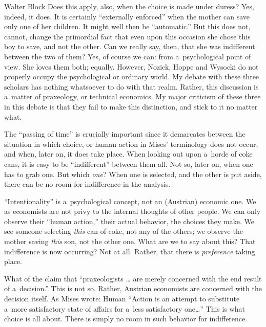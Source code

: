 \begin{artengenv}{Walter Block}
Does this apply, also, when the choice is made under duress? Yes, indeed, it does. It is certainly ``externally enforced'' when the mother can save only one of her children. It might well then be ``automatic.'' But this does not, cannot, change the primordial fact that even upon this occasion she chose this boy to save, and not the other. Can we really say, then, that she was indifferent between the two of them? Yes, of course we can: from a~psychological point of view. She loves them both; equally. However, Nozick, Hoppe and Wysocki do not properly occupy the psychological or ordinary world. My debate with these three scholars has nothing whatsoever to do with that realm. Rather, this discussion is a~matter of praxeology, or technical economics. My major criticism of these three in this debate is that they fail to make this distinction, and stick to it no matter what.

The ``passing of time'' is crucially important since it demarcates between the situation in which choice, or human action in Mises' terminology does not occur, and when, later on, it does take place. When looking out upon a~horde of coke cans, it is easy to be ``indifferent'' between them all. Not so, later on, when one has to grab one. But which \textit{one}? When one is selected, and the other is put aside, there can be no room for indifference in the analysis.

``Intentionality'' is a~psychological concept, not an (Austrian) economic one. We as economists are not privy to the internal thoughts of other people. We can only observe their ``human action,'' their actual behavior, the choices they make. We see someone selecting \textit{this} can of coke, not any of the others; we observe the mother saving \textit{this} son, not the other one. What are we to say about this? That indifference is now occurring? Not at all. Rather, that there is \textit{preference} taking place.

What of the claim that ``praxeologists … are merely concerned with the end result of a~decision.'' This is not so. Rather, Austrian economists are concerned with the decision itself. As Mises
\parencite*[][p.97]{mises_human_1998} %
 wrote: Human ``Action is an attempt to substitute a~more satisfactory state of affairs for a~less satisfactory one…'' This is what choice is all about. There is simply no room in such behavior for indifference.

\end{artengenv}

